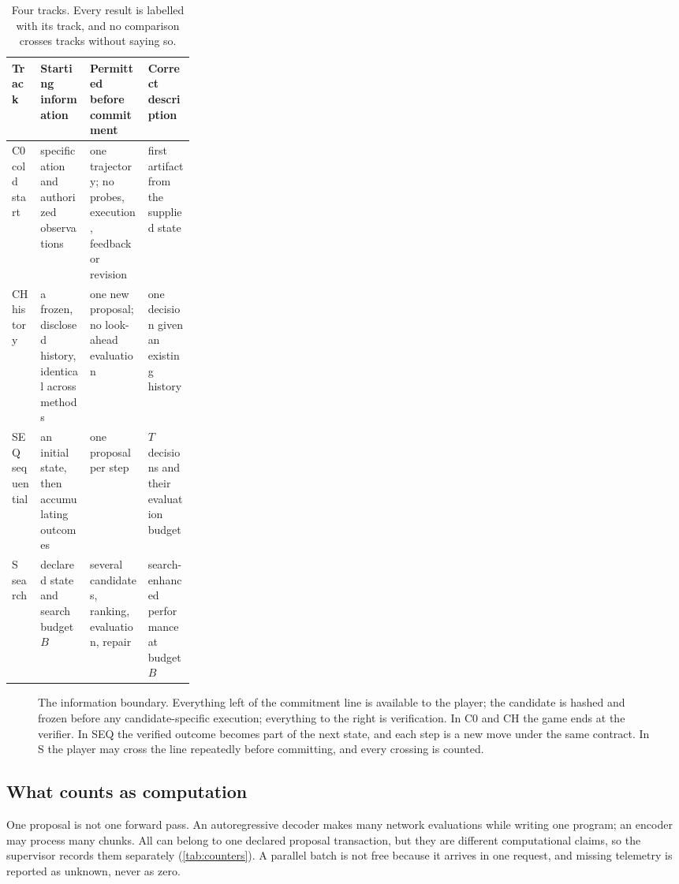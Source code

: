 \begin{table}[t]
\caption{Four tracks. Every result is labelled with its track, and no comparison crosses tracks
without saying so.}
\label{tab:tracks}
\centering\tablesf
\begin{tabularx}{\linewidth}{@{}l>{\raggedright\arraybackslash}p{0.27\linewidth}LL@{}}
\toprule
Track & Starting information & Permitted before commitment & Correct description \\
\midrule
C0 cold start & specification and authorized observations & one trajectory; no probes, execution, feedback or revision & first artifact from the supplied state \\
CH history & a frozen, disclosed history, identical across methods & one new proposal; no look-ahead evaluation & one decision given an existing history \\
SEQ sequential & an initial state, then accumulating outcomes & one proposal per step & $T$ decisions and their evaluation budget \\
S search & declared state and search budget $B$ & several candidates, ranking, evaluation, repair & search-enhanced performance at budget $B$ \\
\bottomrule
\end{tabularx}
\end{table}

\begin{figure}[t]
\centering

\caption{The information boundary. Everything left of the commitment line is available to the
player; the candidate is hashed and frozen before any candidate-specific execution; everything to the
right is verification. In C0 and CH the game ends at the verifier. In SEQ the verified outcome
becomes part of the next state, and each step is a new move under the same contract. In S the player
may cross the line repeatedly before committing, and every crossing is counted.}
\label{fig:protocol}
\end{figure}

\subsection{What counts as computation}

One proposal is not one forward pass. An autoregressive decoder makes many network evaluations while
writing one program; an encoder may process many chunks. All can belong to one declared proposal
transaction, but they are different computational claims, so the supervisor records them separately
(\cref{tab:counters}). A parallel batch is not free because it arrives in one request, and missing
telemetry is reported as unknown, never as zero.

